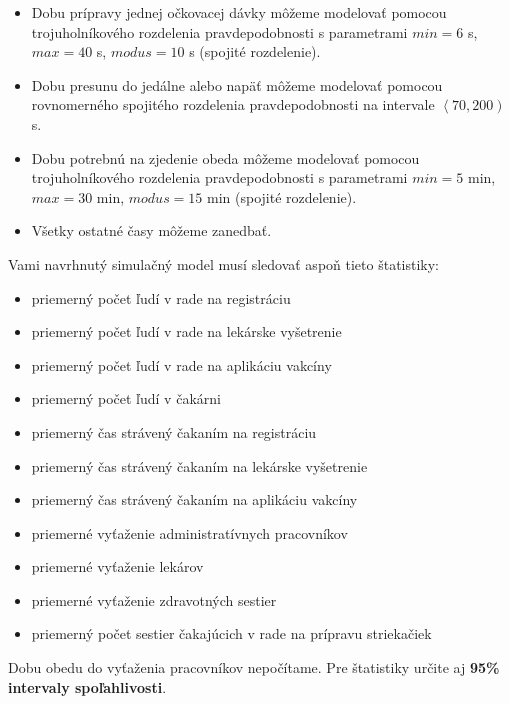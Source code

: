 \documentclass[letterpaper]{article}
\begin{document}
\begin{itemize}
\begin{itemize}
			\item Dobu prípravy jednej očkovacej dávky môžeme modelovať pomocou trojuholníkového rozdelenia pravdepodobnosti s parametrami $ min = 6 $ s, $ max = 40 $ s, $ modus = 10 $ s (spojité rozdelenie).
			\item Dobu presunu do jedálne alebo napäť môžeme modelovať pomocou rovnomerného spojitého rozdelenia pravdepodobnosti na intervale $ \left\langle 70, 200 \right) $ s. 
			\item Dobu potrebnú na zjedenie obeda môžeme modelovať pomocou trojuholníkového rozdelenia pravdepodobnosti s parametrami $ min = 5 $ min, $ max = 30 $ min, $ modus = 15 $ min (spojité rozdelenie).

			\item Všetky ostatné časy môžeme zanedbať.
		\end{itemize}
	\end{itemize}
	
	\noindent Vami navrhnutý simulačný model musí sledovať aspoň tieto štatistiky: 
	\begin{itemize}
		\item priemerný počet ľudí v rade na registráciu
		\item priemerný počet ľudí v rade na lekárske vyšetrenie
		\item priemerný počet ľudí v rade na aplikáciu vakcíny
		\item priemerný počet ľudí v čakárni
		\item priemerný čas strávený čakaním na registráciu
		\item priemerný čas strávený čakaním na lekárske vyšetrenie
		\item priemerný čas strávený čakaním na aplikáciu vakcíny
		\item priemerné vyťaženie administratívnych pracovníkov
		\item priemerné vyťaženie lekárov
		\item priemerné vyťaženie zdravotných sestier
		\item priemerný počet sestier čakajúcich v rade na prípravu striekačiek
	\end{itemize}
	Dobu obedu do vyťaženia pracovníkov nepočítame. Pre štatistiky určite aj \textbf{95\% intervaly spoľahlivosti}.
	
\end{document}
